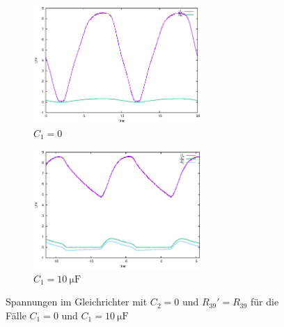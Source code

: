 \documentclass[10pt,a4paper]{scrartcl}
\begin{document}
\begin{figure}[!ht]
    \begin{subfigure}{\textwidth}
        \centering
        \includegraphics[width=0.7\textwidth]{graphics/gleichrichter_0F.eps}
        \caption{$C_1=0$}
    \end{subfigure}
    \begin{subfigure}{\textwidth}
        \centering
        \includegraphics[width=0.7\textwidth]{graphics/gleichrichter_10uF.eps}
        \caption{$C_1=10~\mathrm{\mu F}$}
    \end{subfigure}
    \caption{Spannungen im Gleichrichter mit $C_2=0$ und $R_{39}'=R_{39}$ für
        die Fälle $C_1=0$ und $C_1=10~\mathrm{\mu F}$}
    \label{fig:Gleichrichter_U}
\end{figure}
\end{document}
